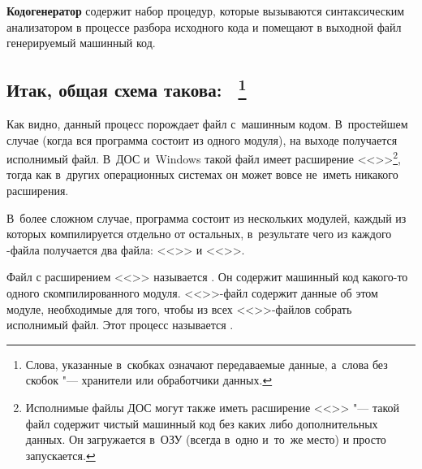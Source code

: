{\bfseries Кодогенератор} содержит набор процедур, которые вызываются
синтаксическим анализатором в процессе разбора исходного кода и
помещают в выходной файл генерируемый машинный код.

\subsection*{Итак, общая схема такова:\ \protect
\footnote{Слова, указанные в~скобках означают передаваемые данные,
а~слова без скобок "--- хранители или обработчики данных.}}

\begin{center}
\end{center}

Как видно, данный процесс порождает файл с~машинным кодом.
В~простейшем случае (когда вся программа состоит из одного модуля),
на выходе получается исполнимый файл. В~ДОС и~Windows
такой файл имеет расширение
<<>>\footnote{Исполнимые файлы ДОС могут также иметь
расширение <<>> "--- такой файл содержит чистый машинный код
без каких либо дополнительных данных. Он загружается в~ОЗУ (всегда
в~одно и~то~же место) и просто запускается.}, тогда
как в~других операционных системах он может вовсе не~иметь никакого
расширения.

В~более сложном случае, программа состоит из нескольких модулей, каждый
из которых компилируется отдельно от остальных, в~результате чего из
каждого -файла получается два файла:
<<>> и <<>>.

Файл с расширением <<>> называется .
Он содержит машинный код какого-то одного скомпилированного модуля.
<<>>-файл содержит данные об этом модуле, необходимые для того,
чтобы из всех <<>>-файлов собрать исполнимый файл. Этот процесс
называется .

\newpage
